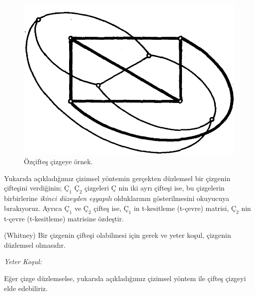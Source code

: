 \documentclass[11pt]{amsbook}
\begin{document}

\begin{figure}[htbp]
\begin{center}
	\includegraphics[width = 0.5\columnwidth]{images/ceyhun-211-fig01.png}
	\caption{Özçifteş çizgeye örnek.}
	\label{211-fig01}
\end{center}
\end{figure}

Yukarıda açıkladığımız çizimsel yöntemin gerçekten düzlemsel bir çizgenin çifteşini verdiğinin; $Ç_1$ $Ç_2$ çizgeleri $Ç$ nin iki ayrı çifteşi ise, bu çizgelerin birbirlerine \textit{ikinci düzeyden eşyapılı} olduklarının gösterilmesini okuyucuya bırakıyoruz. Ayrıca $Ç_1$ ve $Ç_2$ çifteş ise, $Ç_1$ in t-kesitleme (t-çevre) matrisi, $Ç_2$ nin t-çevre (t-kesitleme) matrisine özdeştir.

\begin{theorem}
(Whitney) Bir çizgenin çifteşi olabilmesi için gerek ve yeter koşul, çizgenin düzlemsel olmasıdır.
\end{theorem}

\begin{tanit}
\textit{Yeter Koşul:}

Eğer çizge düzlemselse, yukarıda açıkladığımız çizimsel yöntem ile çifteş çizgeyi elde edebiliriz.
\end{tanit}
\end{document}
